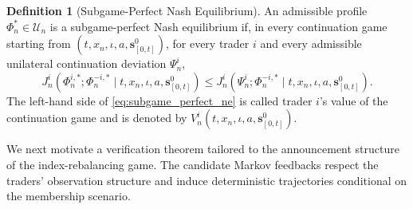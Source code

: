 \documentclass[12pt]{article}
\numberwithin{equation}{section}
\theoremstyle{definition}
\newtheorem{definition}[theorem]{Definition}
\begin{document}
\begin{definition}[Subgame-Perfect Nash Equilibrium]
\label{def:subgame_perfect_nash_equilibrium}
An admissible profile \(\Phi_n^*\in\mathcal U_n\) is a subgame-perfect Nash
equilibrium if, in every continuation game starting from
\((t,x_n,\iota,a,\mathbf{s}^0_{[0,t]})\), for every trader
\(i\) and every admissible unilateral continuation
deviation \(\Psi_n^i\),
\begin{equation}\label{eq:subgame_perfect_ne}
J_n^i\left(
\Phi_n^{i,*};\Phi_n^{-i,*}
\mid t,x_n,\iota,a,\mathbf{s}^0_{[0,t]}
\right)
\leq
J_n^i\left(
\Psi_n^i;\Phi_n^{-i,*}
\mid t,x_n,\iota,a,\mathbf{s}^0_{[0,t]}
\right).
\end{equation}
The left-hand side of \eqref{eq:subgame_perfect_ne} is called trader \(i\)'s
value of the continuation game and is denoted by
\(V_n^i(t,x_n,\iota,a,\mathbf{s}^0_{[0,t]})\).
\end{definition}


We next motivate a verification theorem tailored to the announcement structure
of the index-rebalancing game. The candidate Markov feedbacks respect the
traders' observation structure and induce deterministic trajectories
conditional on the membership scenario.
\end{document}

